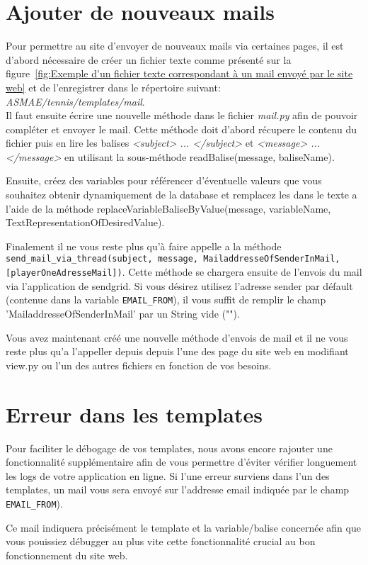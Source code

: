 \section{Ajouter de nouveaux mails}

Pour permettre au site d'envoyer de nouveaux mails via certaines pages, il est d'abord nécessaire de créer un fichier texte comme présenté sur la figure~\ref{fig:Exemple d'un fichier texte correspondant à un mail envoyé par le site web} et de l'enregistrer dans le répertoire suivant: \textit{ASMAE/tennis/templates/mail}.\\

Il faut ensuite écrire une nouvelle méthode dans le fichier \textit{mail.py} afin de pouvoir compléter et envoyer le mail. Cette méthode doit d'abord récupere le contenu du fichier
 puis en lire les balises \textit{<subject> ... </subject>} et 
 \textit{<message> ... </message>} en utilisant la
sous-méthode readBalise(message, baliseName). \newline

Ensuite, créez des variables pour référencer d'éventuelle valeurs que vous souhaitez 
obtenir dynamiquement de la database et remplacez les dans le texte a l'aide de la méthode 
replaceVariableBaliseByValue(message, variableName, TextRepresentationOfDesiredValue).\newline

Finalement il ne vous reste plus qu'à faire appelle a la méthode \verb|send_mail_via_thread(subject, message, MailaddresseOfSenderInMail, [playerOneAdresseMail])|.
Cette méthode se chargera ensuite de l'envois du mail via l'application de sendgrid. 
Si vous désirez utilisez l'adresse sender par défault (contenue dans la variable 
\verb|EMAIL_FROM|), il vous suffit de remplir le champ 'MailaddresseOfSenderInMail' par
un String vide (""). \newline

Vous avez maintenant créé une nouvelle méthode d'envois de mail et il ne vous reste 
plus qu'a l'appeller depuis depuis l'une des page du site web en modifiant view.py ou
l'un des autres fichiers en fonction de vos besoins.

\section{Erreur dans les templates}

Pour faciliter le débogage de vos templates, nous avons encore rajouter une fonctionnalité
supplémentaire afin de vous permettre d'éviter vérifier longuement les logs de 
votre application en ligne. Si l'une erreur surviens dans l'un des templates, un mail
vous sera envoyé sur l'addresse email indiquée par le champ \verb|EMAIL_FROM|).
\newline

Ce mail indiquera précisément le template et la variable/balise concernée afin que vous
pouissiez débugger au plus vite cette fonctionnalité crucial au bon fonctionnement du
site web.
